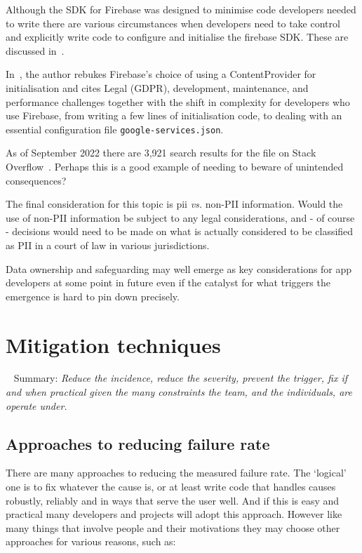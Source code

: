 \begin{kaobox}[frametitle="Firebase Android SDK's use of a ContentProvider"]
Although the SDK for Firebase was designed to minimise code developers needed to write there are various circumstances when developers need to take control and explicitly write code to configure and initialise the firebase SDK. These are discussed in~.

In~, the author rebukes Firebase's choice of using a ContentProvider for initialisation and cites Legal (GDPR), development, maintenance, and performance challenges together with the shift in complexity for developers who use Firebase, from writing a few lines of initialisation code, to dealing with an essential configuration file \texttt{google-services.json}. 

As of  September 2022 there are 3,921 search results for the file on Stack Overflow~. Perhaps this is a good example of needing to beware of unintended consequences?
\end{kaobox}

The final consideration for this topic is \Gls{pii} \emph{vs.} non-PII information. Would the use of non-PII information be subject to any legal considerations, and - of course - decisions would need to be made on what is actually considered to be classified as PII in a court of law in various jurisdictions.

\afterpage{\clearpage}

Data ownership and safeguarding may well emerge as key considerations for app developers at some point in future even if the catalyst for what triggers the emergence is hard to pin down precisely. 




\section{Mitigation techniques}~\label{discussion-mitigation-techniques-section}
Summary: \emph{Reduce the incidence, reduce the severity, prevent the trigger, fix if and when practical given the many constraints the team, and the individuals,  are operate under.}

\subsection{Approaches to reducing failure rate}
There are many approaches to reducing the measured failure rate. The `logical' one is to fix whatever the cause is, or at least write code that handles causes robustly, reliably and in ways that serve the user well. And if this is easy and practical many developers and projects will adopt this approach. However like many things that involve people and their motivations they may choose other approaches for various reasons, such as:

